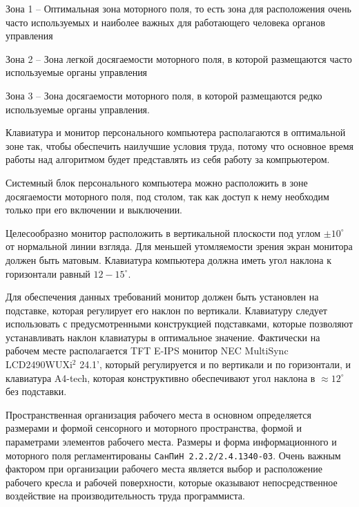 \begin{mintemize}
\item Зона 1 -- Оптимальная зона моторного поля, то есть
    зона для расположения очень часто используемых и наиболее
    важных для работающего человека органов управления
\item Зона 2 -- Зона легкой досягаемости моторного поля,
    в которой размещаются часто используемые органы управления
\item Зона 3 -- Зона досягаемости моторного поля,
    в которой размещаются редко используемые органы управления.
\end{mintemize}

Клавиатура и монитор персонального компьютера располагаются в
оптимальной зоне так, чтобы обеспечить наилучшие условия труда,
потому что основное время работы над алгоритмом будет представлять
из себя работу за компрьютером.

Системный блок персонального компьютера можно расположить в зоне
досягаемости моторного поля, под столом, так как доступ к нему необходим
только при его включении и выключении.

Целесообразно монитор расположить в вертикальной плоскости под углом
$\pm 10^\circ$ от нормальной линии взгляда. Для меньшей утомляемости
зрения экран монитора должен быть матовым. Клавиатура компьютера
должна иметь угол наклона к горизонтали равный $12-15^\circ$.

Для обеспечения данных требований монитор должен быть установлен на
подставке, которая регулирует его наклон по вертикали.  Клавиатуру
следует использовать с предусмотренными конструкцией подставками,
которые позволяют устанавливать наклон клавиатуры в оптимальное значение.
Фактически на рабочем месте располагается TFT E-IPS монитор
NEC MultiSync LCD2490WUXi$^2$ 24.1', который регулируется и по
вертикали и по горизонтали, и клавиатура A4-tech, которая конструктивно
обеспечивают угол наклона в $\approx 12^\circ$ без подставки.

Пространственная организация рабочего места в основном определяется
размерами и формой сенсорного и моторного пространства, формой и
параметрами элементов рабочего места. Размеры и форма информационного
и моторного поля регламентированы \verb|СанПиН 2.2.2/2.4.1340-03|.
Очень важным фактором при организации рабочего места является выбор и
расположение рабочего кресла и рабочей поверхности, которые оказывают
непосредственное воздействие на производительность труда программиста.

